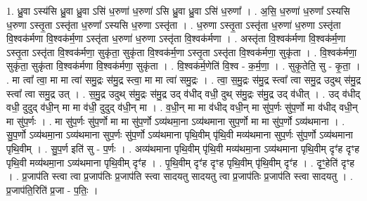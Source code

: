 \documentclass[17pt]{extarticle}
\begin{document}
1. ध्रु॒वा ऽस्य॑सि ध्रु॒वा ध्रु॒वा ऽसि॑ ध॒रुणा॑ ध॒रुणा॑ ऽसि ध्रु॒वा ध्रु॒वा ऽसि॑ ध॒रुणा᳚ । . अ॒सि॒ ध॒रुणा॑ ध॒रुणा᳚ ऽस्यसि ध॒रुणा ऽस्तृ॒ता ऽस्तृ॑ता ध॒रुणा᳚ ऽस्यसि ध॒रुणा ऽस्तृ॑ता । . ध॒रुणा ऽस्तृ॒ता ऽस्तृ॑ता ध॒रुणा॑ ध॒रुणा ऽस्तृ॑ता वि॒श्वक॑र्मणा वि॒श्वक॑र्म॒णा ऽस्तृ॑ता ध॒रुणा॑ ध॒रुणा ऽस्तृ॑ता वि॒श्वक॑र्मणा । . अस्तृ॑ता वि॒श्वक॑र्मणा वि॒श्वक॑र्म॒णा ऽस्तृ॒ता ऽस्तृ॑ता वि॒श्वक॑र्मणा॒ सुकृ॑ता॒ सुकृ॑ता वि॒श्वक॑र्म॒णा ऽस्तृ॒ता ऽस्तृ॑ता वि॒श्वक॑र्मणा॒ सुकृ॑ता । . वि॒श्वक॑र्मणा॒ सुकृ॑ता॒ सुकृ॑ता वि॒श्वक॑र्मणा वि॒श्वक॑र्मणा॒ सुकृ॑ता । . वि॒श्वक॑र्म॒णेति॑ वि॒श्व - क॒र्म॒णा॒ । . सुकृ॒तेति॒ सु - कृ॒ता॒ । . मा त्वा᳚ त्वा॒ मा मा त्वा॑ समु॒द्रः स॑मु॒द्र स्त्वा॒ मा मा त्वा॑ समु॒द्रः । . त्वा॒ स॒मु॒द्रः स॑मु॒द्र स्त्वा᳚ त्वा समु॒द्र उदुथ् स॑मु॒द्र स्त्वा᳚ त्वा समु॒द्र उत् । . स॒मु॒द्र उदुथ् स॑मु॒द्रः स॑मु॒द्र उद् व॑धीद् वधी॒ दुथ् स॑मु॒द्रः स॑मु॒द्र उद् व॑धीत् । . उद् व॑धीद् वधी॒ दुदुद् व॑धी॒न् मा मा व॑धी॒ दुदुद् व॑धी॒न् मा । . व॒धी॒न् मा मा व॑धीद् वधी॒न् मा सु॑प॒र्णः सु॑प॒र्णो मा व॑धीद् वधी॒न् मा सु॑प॒र्णः । . मा सु॑प॒र्णः सु॑प॒र्णो मा मा सु॑प॒र्णो ऽव्य॑थमा॒ना ऽव्य॑थमाना सुप॒र्णो मा मा सु॑प॒र्णो ऽव्य॑थमाना । . सु॒प॒र्णो ऽव्य॑थमा॒ना ऽव्य॑थमाना सुप॒र्णः सु॑प॒र्णो ऽव्य॑थमाना पृथि॒वीम् पृ॑थि॒वी मव्य॑थमाना सुप॒र्णः सु॑प॒र्णो ऽव्य॑थमाना पृथि॒वीम् । . सु॒प॒र्ण इति॑ सु - प॒र्णः । . अव्य॑थमाना पृथि॒वीम् पृ॑थि॒वी मव्य॑थमा॒ना ऽव्य॑थमाना पृथि॒वीम् दृꣳ॑ह दृꣳह पृथि॒वी मव्य॑थमा॒ना ऽव्य॑थमाना पृथि॒वीम् दृꣳ॑ह । . पृ॒थि॒वीम् दृꣳ॑ह दृꣳह पृथि॒वीम् पृ॑थि॒वीम् दृꣳ॑ह । . दृꣳ॒॒हेति॑ दृꣳह । . प्र॒जाप॑ति स्त्वा त्वा प्र॒जाप॑तिः प्र॒जाप॑ति स्त्वा सादयतु सादयतु त्वा प्र॒जाप॑तिः प्र॒जाप॑ति स्त्वा सादयतु । . प्र॒जाप॑ति॒रिति॑ प्र॒जा - प॒तिः॒ । \newline
\end{document}
